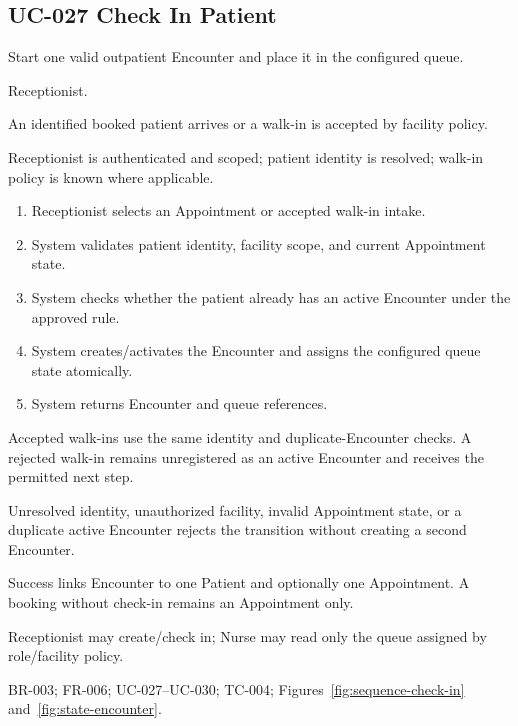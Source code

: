 \documentclass[a4paper,12pt]{article}
\begin{document}
\subsection{UC-027 Check In Patient}
\begin{description}[leftmargin=2.6cm,style=nextline]
\item[Goal] Start one valid outpatient Encounter and place it in the configured queue.
\item[Primary actor] Receptionist.
\item[Trigger] An identified booked patient arrives or a walk-in is accepted by facility policy.
\item[Preconditions] Receptionist is authenticated and scoped; patient identity is resolved; walk-in policy is known where applicable.
\item[Main success flow]
\begin{enumerate}[leftmargin=1.4em]
  \item Receptionist selects an Appointment or accepted walk-in intake.
  \item System validates patient identity, facility scope, and current Appointment state.
  \item System checks whether the patient already has an active Encounter under the approved rule.
  \item System creates/activates the Encounter and assigns the configured queue state atomically.
  \item System returns Encounter and queue references.
\end{enumerate}
\item[Alternative flows] Accepted walk-ins use the same identity and duplicate-Encounter checks. A rejected walk-in remains unregistered as an active Encounter and receives the permitted next step.
\item[Exception flows] Unresolved identity, unauthorized facility, invalid Appointment state, or a duplicate active Encounter rejects the transition without creating a second Encounter.
\item[Postconditions and data] Success links Encounter to one Patient and optionally one Appointment. A booking without check-in remains an Appointment only.
\item[Authorization] Receptionist may create/check in; Nurse may read only the queue assigned by role/facility policy.
\item[Trace] BR-003; FR-006; UC-027--UC-030; TC-004; Figures~\ref{fig:sequence-check-in} and~\ref{fig:state-encounter}.
\end{description}
\end{document}

